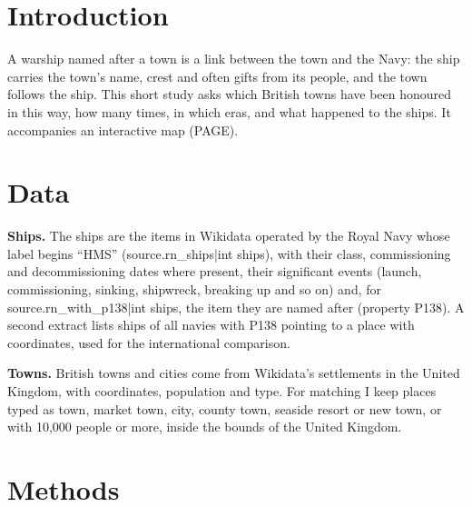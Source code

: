 \documentclass[11pt,a4paper]{article}
\begin{document}
\section{Introduction}
A warship named after a town is a link between the town and the Navy: the ship carries the town's name, crest and often gifts from its people, and the town follows the ship. This short study asks which British towns have been honoured in this way, how many times, in which eras, and what happened to the ships. It accompanies an interactive map ({{PAGE}}).

\section{Data}
\textbf{Ships.} The ships are the items in Wikidata \citep{wikidata} operated by the Royal Navy whose label begins ``HMS'' ({{source.rn_ships|int}} ships), with their class, commissioning and decommissioning dates where present, their significant events (launch, commissioning, sinking, shipwreck, breaking up and so on) and, for {{source.rn_with_p138|int}} ships, the item they are named after (property P138). A second extract lists ships of all navies with P138 pointing to a place with coordinates, used for the international comparison.

\textbf{Towns.} British towns and cities come from Wikidata's settlements in the United Kingdom, with coordinates, population and type. For matching I keep places typed as town, market town, city, county town, seaside resort or new town, or with 10,000 people or more, inside the bounds of the United Kingdom.

\section{Methods}
\end{document}
